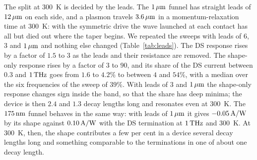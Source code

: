 The split at $300$~K is decided by the leads. The $1\,\mu\mathrm{m}$ funnel has
straight leads of $12\,\mu\mathrm{m}$ on each side, and a plasmon travels $3.6\,\mu\mathrm{m}$ in
a momentum-relaxation time at $300$~K: with the symmetric drive the wave
launched at each contact has all but died out where the taper begins. We
repeated the sweeps with leads of $6$, $3$ and $1\,\mu\mathrm{m}$ and nothing else
changed (Table~\ref{tab:leads}). The DS response rises by a factor of
$1.5$ to $3$ as the leads and their resistance are removed. The
shape-only response rises by a factor of $3$ to $90$, and its share of
the DS current between $0.3$ and $1\,\mathrm{THz}$ goes from $1.6$ to $4.2\%$ to
between $4$ and $54\%$, with a median over the six frequencies of the
sweep of $39\%$. With leads of $3$ and $1\,\mu\mathrm{m}$ the shape-only response
changes sign inside the band, so that the share has deep minima; the
device is then $2.4$ and $1.3$ decay lengths long and resonates even at
$300$~K. The $175\,\mathrm{nm}$ funnel behaves in the same way: with leads of
$1\,\mu\mathrm{m}$ it gives $-0.05\,\mathrm{A/W}$ by its shape against $0.10\,\mathrm{A/W}$ with the DS
termination at $1\,\mathrm{THz}$ and $300$~K. At $300$~K, then, the shape
contributes a few per cent in a device several decay lengths long and
something comparable to the terminations in one of about one decay
length.

